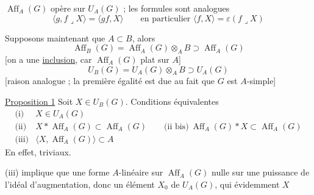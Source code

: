 $\operatorname{Aff}_A(G)$ opère  sur $U_A(G)$ ; les formules sont  analogues
\[
\langle g,f\mathbin{\lrcorner}X\rangle=\langle gf,X\rangle
\qquad\text{en particulier }\langle f,X\rangle=\varepsilon(f\mathbin{\lrcorner}X)
\]

Supposons maintenant que $A\subset B$, alors
\[
\operatorname{Aff}_B(G)=\operatorname{Aff}_A(G)\otimes_A B\supset\operatorname{Aff}_A(G)
\]
[on a une \uline{inclusion}, car $\operatorname{Aff}_A(G)$ plat sur $A$]
\[
U_B(G)=U_A(G)\otimes_A B\supset U_A(G)
\]
[raison analogue ; la première égalité est due au fait que $G$ est $A$-simple]

\uline{Proposition 1} Soit $X\in U_B(G)$. Conditions équivalentes
\[
\begin{array}{ll}
\text{(i)}&X\in U_A(G)\\
\text{(ii)}&X*\operatorname{Aff}_A(G)\subset\operatorname{Aff}_A(G)
\qquad\text{(ii bis)}\ \operatorname{Aff}_A(G)*X\subset\operatorname{Aff}_A(G)\\
\text{(iii)}&\langle X,\operatorname{Aff}_A(G)\rangle\subset A
\end{array}
\]
En effet,
triviaux.

(iii) implique que    une forme $A$-linéaire sur $\operatorname{Aff}_A(G)$ nulle sur une puissance de l'idéal d'augmentation, donc un élément $X_0$ de $U_A(G)$, qui  évidemment  $X$
